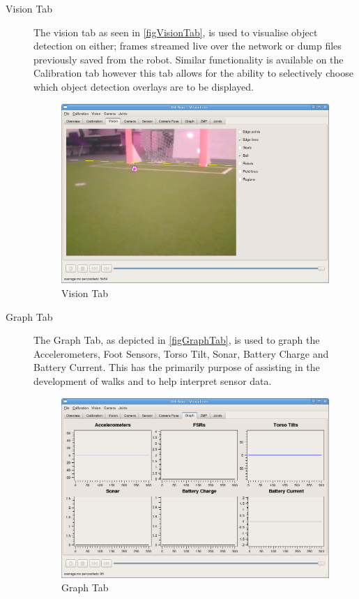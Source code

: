 \documentclass[pdftex,11pt,a4paper]{report}
\begin{document}
\begin{description}
\item[Vision Tab]
The vision tab as seen in \autoref{figVisionTab}, is used to visualise
object detection on either; frames streamed live over the network or dump
files previously saved from the robot. Similar functionality is available
on the Calibration tab however this tab allows for the ability to selectively choose which object detection overlays are to be displayed.
\begin{figure}[ht]
\centering
\includegraphics[width=1.0\textwidth]{figures/visionTab}
\caption{Vision Tab} \label{figVisionTab}
\end{figure}



\item[Graph Tab]
The Graph Tab, as depicted in \autoref{figGraphTab}, is used to graph
the Accelerometers, Foot Sensors, Torso Tilt, Sonar, Battery Charge and Battery Current. This has the primarily purpose of assisting in the development of walks and to help interpret sensor data.


\begin{figure}[ht]
\centering
\includegraphics[width=1.0\textwidth]{figures/graphTab}
\caption{Graph Tab} \label{figGraphTab}
\end{figure}


\end{description}
\end{document}

